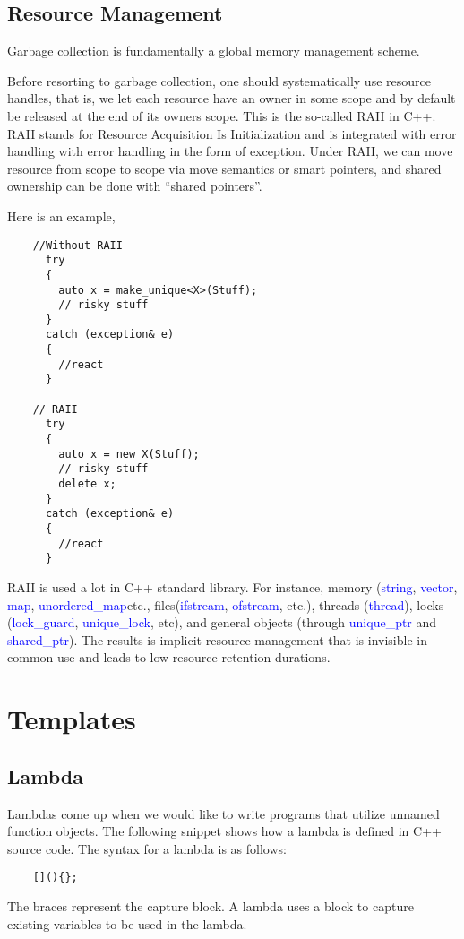 \documentclass{article}
\newcommand{\be}[1]{\textcolor{blue}{#1}}
\begin{document}
\subsection{Resource Management}
Garbage collection is fundamentally a global memory management scheme.

Before resorting to garbage collection, one should systematically use resource handles, that is, we let each resource have an owner in some scope and by default be released at the end of its owners scope. This is the so-called RAII in C++. RAII stands for Resource Acquisition Is Initialization and is integrated with error handling with error handling in the form of exception. Under RAII, we can move resource from scope to scope via move semantics or smart pointers, and shared ownership can be done with ``shared pointers''.

Here is an example, 

\begin{multicols}{2}
    \begin{verbatim}
	//Without RAII
	  try
	  {
	    auto x = make_unique<X>(Stuff);
	    // risky stuff
	  }
	  catch (exception& e)
	  {
	  	//react
	  }
	  
	// RAII  
	  try
	  {
	    auto x = new X(Stuff);
	    // risky stuff
		delete x;
	  }
	  catch (exception& e)
	  {
	  	//react
	  }
    \end{verbatim}
\end{multicols}

RAII is used a lot in C++ standard library. For instance, memory (\be{string}, \be{vector}, \be{map}, \be{unordered\_map}etc., files(\be{ifstream}, \be{ofstream}, etc.), threads (\be{thread}), locks (\be{lock\_guard}, \be{unique\_lock}, etc), and general objects (through \be{unique\_ptr} and \be{shared\_ptr}). The results is implicit resource management that is invisible in common use and leads to low resource retention durations.

\section{Templates}

\subsection{Lambda}
Lambdas come up when we would like to write programs that utilize unnamed function objects. The following snippet shows how a lambda is defined in C++ source code. The syntax for a lambda is as follows:
\begin{verbatim}
	[](){};
\end{verbatim}
The braces represent the capture block. A lambda uses a block to capture existing variables to be used in the lambda. 
\end{document}
